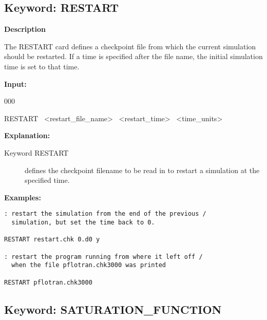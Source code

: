 \subsection{Keyword: RESTART}
{\noindent\bf Description}

The RESTART card defines a checkpoint file from which the current simulation should be restarted.  If a time is specified after the file name, the initial simulation time is set to that time.

{\noindent\bf Input:}

\begin{deflist}{000}
\item[RESTART] \ <restart\_file\_name> \ <restart\_time> \ <time\_units>
\end{deflist}

{\noindent\bf Explanation:}
\begin{description}
\item[Keyword RESTART] defines the checkpoint filename to be read in to restart a simulation at the specified time.
\end{description}

{\noindent\bf
Examples:}

\begin{mdframed}

\begin{verbatim}
: restart the simulation from the end of the previous /
  simulation, but set the time back to 0.

RESTART restart.chk 0.d0 y

: restart the program running from where it left off /
  when the file pflotran.chk3000 was printed

RESTART pflotran.chk3000

\end{verbatim}

\end{mdframed}

\hyperlink{target_key}{\return}


\newpage
\protect\hypertarget{target_sat}{}

\subsection{Keyword: SATURATION\_FUNCTION}

